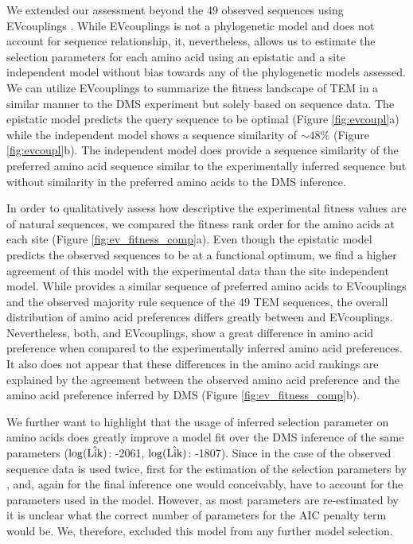 \documentclass[fleqn,letterpaper]{article}
\begin{document}
We extended our assessment beyond the 49 observed sequences using EVcouplings \citet{HopfEtAl2017, HopfEtAl2019}.
While EVcouplings is not a phylogenetic model and does not account for sequence relationship, it, nevertheless, allows us to estimate the selection parameters for each amino acid using an epistatic and a site independent model without bias towards any of the phylogenetic models assessed.
We can utilize EVcouplings to summarize the fitness landscape of TEM in a similar manner to the DMS experiment but solely based on sequence data.
The epistatic model predicts the query sequence to be optimal (Figure \ref{fig:evcoupl}a) while the independent model shows a sequence similarity of $\sim48\%$ (Figure \ref{fig:evcoupl}b).
The independent model does provide a sequence similarity of the preferred amino acid sequence similar to the experimentally inferred sequence but without similarity in the preferred amino acids to the DMS inference.

In order to qualitatively assess how descriptive the experimental fitness values are of natural sequences, we compared the fitness rank order for the amino acids at each site (Figure \ref{fig:ev_fitness_comp}a).
Even though the epistatic model predicts the observed sequences to be at a functional optimum, we find a higher agreement of this model with the experimental data than the site independent model.
While \selac provides a similar sequence of preferred amino acids to EVcouplings and the observed majority rule sequence of the 49 TEM sequences, the overall distribution of amino acid preferences differs greatly between \selac and EVcouplings.
Nevertheless, both, \selac and EVcouplings, show a great difference in amino acid preference when compared to the experimentally inferred amino acid preferences.
It also does not appear that these differences in the amino acid rankings are explained by the agreement between the observed amino acid preference and the amino acid preference inferred by DMS (Figure \ref{fig:ev_fitness_comp}b).


We further want to highlight that the usage of \selac inferred selection parameter on amino acids does greatly improve a \phydms model fit over the DMS inference of the same parameters (\phydms $\log(\hat{\text{Lik}})$: -2061, \phydmsselac $\log(\hat{\text{Lik}})$: -1807).
Since in the case of \phydmsselac the observed sequence data is used twice, first for the estimation of the selection parameters by \selac, and, again for the final inference \phydms one would conceivably, have to account for the parameters used in the \selac model.
However, as most parameters are re-estimated by \phydms it is unclear what the correct number of parameters for the AIC penalty term would be. 
We, therefore, excluded this model from any further model selection.
\end{document}
